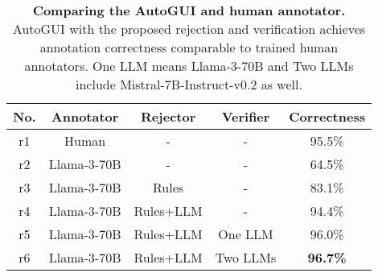 
\begin{table}[]
\small
\centering
\caption{\textbf{Comparing the AutoGUI and human annotator.} AutoGUI with the proposed rejection and verification achieves annotation correctness comparable to trained human annotators. One LLM means Llama-3-70B and Two LLMs include Mistral-7B-Instruct-v0.2 as well.}
\label{tab:ablate autogui}
\begin{tabular}{@{}ccccc@{}}
\toprule
No. & Annotator  & Rejector   & Verifier              & Correctness \\ \midrule
r1 & Human      & -          & -                     & 95.5\%      \\
r2 & Llama-3-70B & -          & -                     & 64.5\%      \\
r3 & Llama-3-70B & Rules      & -                     & 83.1\%      \\
r4 & Llama-3-70B & Rules+LLM  & -                     & 94.4\%      \\
r5 & Llama-3-70B & Rules+LLM  & One LLM            & 96.0\%      \\
r6 & Llama-3-70B & Rules+LLM & Two LLMs & \textbf{96.7\%}      \\ \bottomrule
\end{tabular}
\end{table}
\vspace{-2mm}